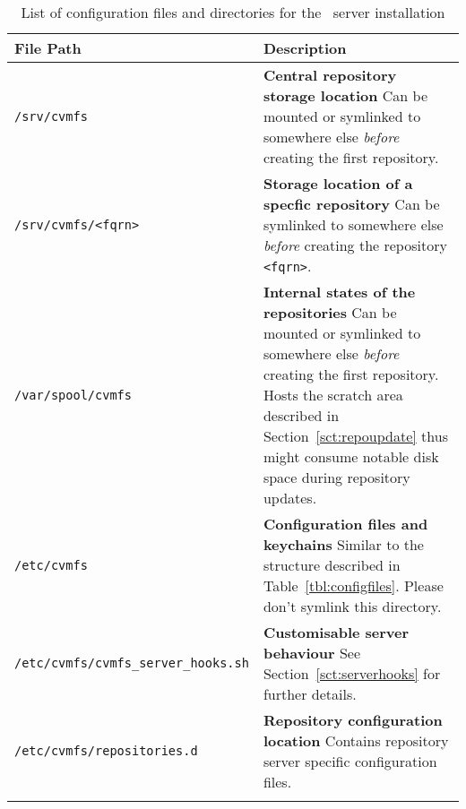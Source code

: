\begin{longtable}{lX}
	\toprule
	{\bf\centering File Path} & {\bf\centering Description} \\
	\midrule
	\texttt{/srv/cvmfs} & \textbf{Central repository storage location} \newline
	Can be mounted or symlinked to somewhere else \emph{before} creating the first repository. \\
	\addlinespace

	\texttt{/srv/cvmfs/<fqrn>} & \textbf{Storage location of a specfic repository} \newline
	Can be symlinked to somewhere else \emph{before} creating the repository \texttt{<fqrn>}. \\
	\addlinespace

	\texttt{/var/spool/cvmfs} & \textbf{Internal states of the repositories} \newline
	Can be mounted or symlinked to somewhere else \emph{before} creating the first repository. Hosts the scratch area described in Section~\ref{sct:repoupdate} thus might consume notable disk space during repository updates. \\			\addlinespace

	\texttt{/etc/cvmfs} & \textbf{Configuration files and keychains} \newline
	Similar to the structure described in Table~\ref{tbl:configfiles}. Please don't symlink this directory. \\
	\addlinespace

	\texttt{/etc/cvmfs/cvmfs\_server\_hooks.sh} & \textbf{Customisable server behaviour} \newline
	See Section~\ref{sct:serverhooks} for further details. \\
	\addlinespace

	\texttt{/etc/cvmfs/repositories.d} & \textbf{Repository configuration location} \newline
	Contains repository server specific configuration files.
	 \\
	\bottomrule
	\caption{List of configuration files and directories for the \cvmfs\ server installation}
	\label{tbl:serveranatomyelements}
\end{longtable}
